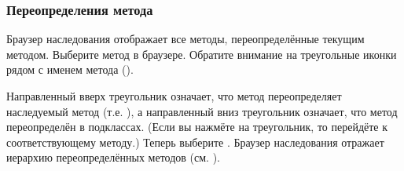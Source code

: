 \documentclass[a4paper,10pt,twoside]{book}
\begin{document}


\subsubsection{Переопределения метода}


Браузер наследования отображает все методы, переопределённые текущим методом. Выберите метод в браузере. Обратите внимание на треугольные иконки рядом с именем метода ().


Направленный вверх треугольник означает, что метод  переопределяет наследуемый метод (т.е. ), а направленный вниз треугольник означает, что метод переопределён в подклассах. (Если вы нажмёте на треугольник, то перейдёте к соответствующему методу.) Теперь выберите . Браузер наследования отражает иерархию переопределённых методов (см. ).
\end{document}
